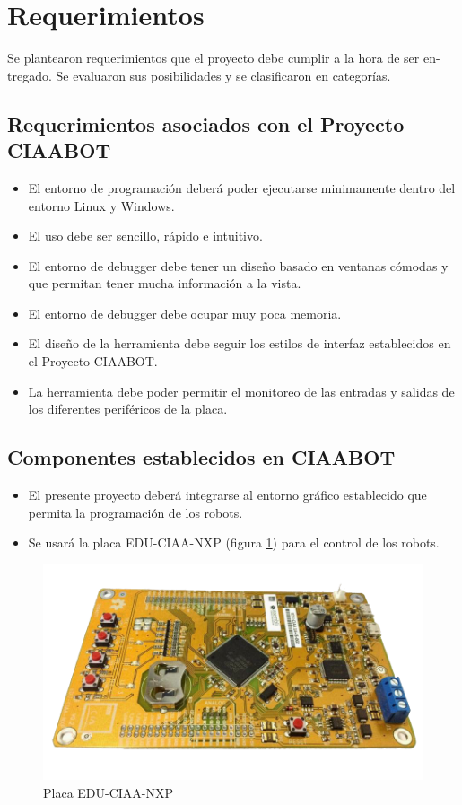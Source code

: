 \section{Requerimientos}
\label{sec:ejemplo}

Se plantearon requerimientos que el proyecto debe cumplir a la hora de ser en-
tregado. Se evaluaron sus posibilidades y se clasificaron en categorías.

\subsection{Requerimientos asociados con el Proyecto CIAABOT}

\begin{itemize}
	\item El entorno de programación deberá poder ejecutarse minimamente dentro del entorno Linux y Windows.	
	\item El uso debe ser sencillo, rápido e intuitivo.
	\item El entorno de debugger debe tener un diseño basado en ventanas cómodas y que permitan
	tener mucha información a la vista.
	\item El entorno de debugger debe ocupar muy poca memoria.
	\item El diseño de la herramienta debe seguir los estilos de interfaz establecidos en el Proyecto CIAABOT.
	\item La herramienta debe poder permitir el monitoreo de las entradas y salidas de los diferentes periféricos de la placa.	
\end{itemize}

\subsection{Componentes establecidos en CIAABOT}

\begin{itemize}
	\item El presente proyecto deberá integrarse al entorno gráfico establecido que permita la programación de los robots.	
	\item Se usará la placa EDU-CIAA-NXP (figura \ref{fig:edu-ciaa-nxp}) para el control de los robots.	
\end{itemize}

\begin{figure}[h]
	\centering
	\includegraphics[scale=.30]{./Figures/edu-ciaa-nxp.png}
	\caption{Placa EDU-CIAA-NXP}
	\label{fig:edu-ciaa-nxp}
\end{figure}


